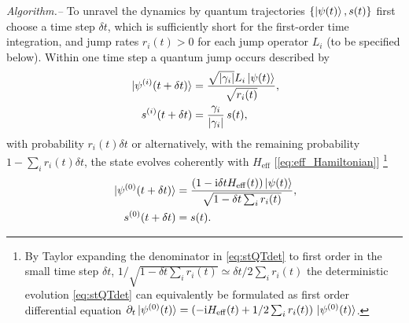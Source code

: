 \documentclass[twocolumn,prl,superscriptaddress]{revtex4-2}
\newcommand{\eff}{\mathrm{eff}}
\renewcommand{\i}{\mathrm i}
\begin{document}
\emph{Algorithm.--}
To unravel the dynamics by quantum trajectories $\{ \ket{\psi(t)} , s(t) \}$ first choose a time step $\delta t$, which is sufficiently short for the first-order time integration, and jump rates $r_i(t)>0$ for each jump operator $L_i$ (to be specified below). Within one time step a quantum jump occurs described by
\begin{align}
	\begin{aligned}
	 \ket*{\psi^{(i)}(t+ \delta t)} &= \frac{\sqrt{|\gamma_i|} L_i \ket{\psi(t)}} {\sqrt{r_i(t)}} , \\
	s^{(i)}(t+ \delta t) &= \frac{\gamma_i}{|\gamma_i|}\, s(t),
	\label{eq:jump}
	\end{aligned}
\end{align} 
with probability $r_i(t)\delta t$
or alternatively, with the remaining probability $1-\sum_i r_i(t)  \delta t$, the state evolves coherently with $H_\mathrm{eff}$ [\cref{eq:eff_Hamiltonian}] \footnote{By Taylor expanding the denominator in  \cref{eq:stQTdet} to first order in the small time step $\delta t$, $1/\sqrt{1- \delta t \sum_i r_i(t)} \simeq \delta t/2 \sum_i r_i(t)$ the deterministic evolution \cref{eq:stQTdet} can equivalently be formulated as first order differential equation $\partial_t \ket*{\psi^{(0)}(t)} =\left( -\mathrm{i} H_\mathrm{eff}(t) + 1/2 \sum_i r_i(t) \right)  \ket*{\psi^{(0)}(t)} $.}
\begin{align}
	\ket*{\psi^{(0)}(t+\delta t)} &= \frac{(1 -\i \delta t  H_\eff(t)) \ket{\psi(t)}}{\sqrt{1-\delta t \sum_i r_i(t)}} , 	\label{eq:stQTdet} \\
	s^{(0)}(t+\delta t)&=s(t).
\end{align} 
\end{document}
